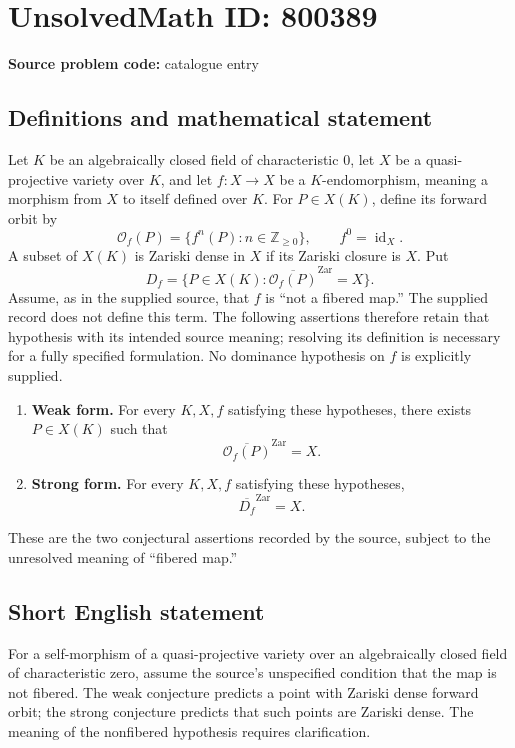 \documentclass[11pt]{article}
\newcommand{\Z}{\mathbb{Z}}
\begin{document}
\section*{UnsolvedMath ID: 800389}
\textbf{Source problem code:} catalogue entry
\subsection{Definitions and mathematical statement}
Let \(K\) be an algebraically closed field of characteristic \(0\), let \(X\) be a quasi-projective variety over \(K\), and let \(f:X\to X\) be a \(K\)-endomorphism, meaning a morphism from \(X\) to itself defined over \(K\). For \(P\in X(K)\), define its forward orbit by
\[
\mathcal O_f(P)=\{f^n(P):n\in\Z_{\geq 0}\},\qquad f^0=\operatorname{id}_X.
\]
A subset of \(X(K)\) is Zariski dense in \(X\) if its Zariski closure is \(X\). Put
\[
D_f=\{P\in X(K):\overline{\mathcal O_f(P)}^{\mathrm{Zar}}=X\}.
\]
Assume, as in the supplied source, that \(f\) is ``not a fibered map.'' The supplied record does not define this term. The following assertions therefore retain that hypothesis with its intended source meaning; resolving its definition is necessary for a fully specified formulation. No dominance hypothesis on \(f\) is explicitly supplied.

\begin{enumerate}
\item[(a)] \textbf{Weak form.} For every \(K,X,f\) satisfying these hypotheses, there exists \(P\in X(K)\) such that
\[
\overline{\mathcal O_f(P)}^{\mathrm{Zar}}=X.
\]
\item[(b)] \textbf{Strong form.} For every \(K,X,f\) satisfying these hypotheses,
\[
\overline{D_f}^{\mathrm{Zar}}=X.
\]
\end{enumerate}
These are the two conjectural assertions recorded by the source, subject to the unresolved meaning of ``fibered map.''
\subsection{Short English statement}
For a self-morphism of a quasi-projective variety over an algebraically closed field of characteristic zero, assume the source's unspecified condition that the map is not fibered. The weak conjecture predicts a point with Zariski dense forward orbit; the strong conjecture predicts that such points are Zariski dense. The meaning of the nonfibered hypothesis requires clarification.
\end{document}
